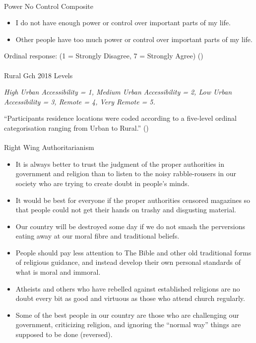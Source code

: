 \documentclass[
  single column]{article}
\makeatletter
\let\oldparagraph\paragraph
\renewcommand{\paragraph}{
    \@ifstar
      \xxxParagraphStar
      \xxxParagraphNoStar
  }
\newcommand{\xxxParagraphStar}[1]{\oldparagraph*{#1}\mbox{}}
\newcommand{\xxxParagraphNoStar}[1]{\oldparagraph{#1}\mbox{}}
\providecommand{\tightlist}{%
  \setlength{\itemsep}{0pt}\setlength{\parskip}{0pt}}\usepackage{longtable,booktabs,array}
\makeatother
\begin{document}
\paragraph{Power No Control Composite}\label{power-no-control-composite}

\begin{itemize}
\tightlist
\item
  I do not have enough power or control over important parts of my life.
\item
  Other people have too much power or control over important parts of my
  life.
\end{itemize}

Ordinal response: (1 = Strongly Disagree, 7 = Strongly Agree)
()

\paragraph{Rural Gch 2018 Levels}\label{rural-gch-2018-levels}

\emph{High Urban Accessibility = 1, Medium Urban Accessibility = 2, Low
Urban Accessibility = 3, Remote = 4, Very Remote = 5.}

``Participants residence locations were coded according to a five-level
ordinal categorisation ranging from Urban to Rural.''
()

\paragraph{Right Wing
Authoritarianism}\label{right-wing-authoritarianism}

\begin{itemize}
\tightlist
\item
  It is always better to trust the judgment of the proper authorities in
  government and religion than to listen to the noisy rabble-rousers in
  our society who are trying to create doubt in people's minds.
\item
  It would be best for everyone if the proper authorities censored
  magazines so that people could not get their hands on trashy and
  disgusting material.
\item
  Our country will be destroyed some day if we do not smash the
  perversions eating away at our moral fibre and traditional beliefs.
\item
  People should pay less attention to The Bible and other old
  traditional forms of religious guidance, and instead develop their own
  personal standards of what is moral and immoral.
\item
  Atheists and others who have rebelled against established religions
  are no doubt every bit as good and virtuous as those who attend church
  regularly.
\item
  Some of the best people in our country are those who are challenging
  our government, criticizing religion, and ignoring the ``normal way''
  things are supposed to be done (reversed).
\end{itemize}
\end{document}
